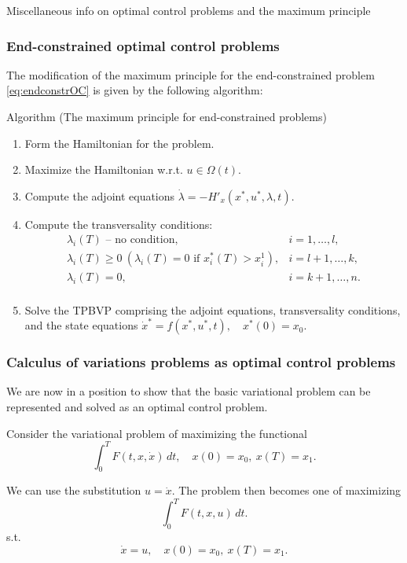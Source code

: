\documentclass[10pt]{beamer}
\theoremstyle{definition}
\begin{document}
\begin{section}{Miscellaneous info on optimal control problems and the maximum principle}
\begin{frame}[fragile]
\frametitle{End-constrained optimal control problems}
The modification of the maximum principle for the end-constrained problem \eqref{eq:endconstrOC} is given by the following algorithm:

\begin{block}{Algorithm (The maximum principle for end-constrained problems)}
\begin{enumerate}
\item Form the Hamiltonian for the problem.
\item Maximize the Hamiltonian w.r.t. $ u \in \Omega(t) $.
\item Compute the adjoint equations $ \dot{\lambda} = -H'_x(x^*,u^*,\lambda,t) $.
\item Compute the transversality conditions:
\begin{equation*}
\begin{array}{ll}
\lambda_i(T) \text{ -- no condition},& i=1,\ldots,l,\\
\lambda_i(T) \geq 0~\left(\lambda_i(T) = 0 \text{ if } x^*_i(T) > x^1_i\right),& i=l+1,\ldots,k,\\
\lambda_i(T)=0 ,& i=k+1,\ldots,n.\\
\end{array}
\end{equation*}
\item Solve the TPBVP comprising the adjoint equations, transversality conditions, and the state equations  $ \dot{x}^* = f(x^*,u^*,t), \quad x^*(0)=x_0 $. 
\end{enumerate}
\end{block}
\end{frame}

\begin{frame}[fragile]
\frametitle{Calculus of variations problems as optimal control problems}
We are now in a position to show that the basic variational problem can be represented and solved as an optimal control problem. \bigskip

Consider the variational problem of maximizing the functional \begin{equation*}
\int_{0}^{T} F(t,x,\dot{x})\,dt,\quad x(0)=x_0, ~x(T)=x_1.
\end{equation*}\bigskip

We can use the substitution $ u = \dot{x} $. The problem then becomes one of maximizing \begin{equation*}
\int_{0}^{T} F(t,x,u)\,dt.
\end{equation*}
s.t. \[ \dot{x}=u,\quad x(0)=x_0, ~x(T)=x_1. \]
\end{frame}


\end{section}
\end{document}
